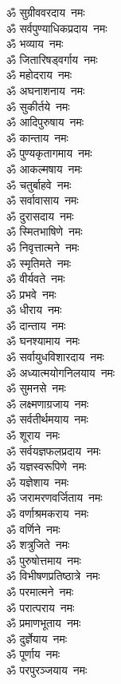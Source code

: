 \begin{multicols}{2}
\begin{flushleft}
ॐ सुग्रीववरदाय~नमः\\
ॐ सर्वपुण्याधिकप्रदाय~नमः\\
ॐ भव्याय~नमः\\
ॐ जितारिषड्वर्गाय~नमः\\
ॐ महोदराय~नमः\hfill{}\\
ॐ अघनाशनाय~नमः\\
ॐ सुकीर्तये~नमः\\
ॐ आदिपुरुषाय~नमः\\
ॐ कान्ताय~नमः\\
ॐ पुण्यकृतागमाय~नमः\\
ॐ आकल्मषाय~नमः\\
ॐ चतुर्बाहवे~नमः\\
ॐ सर्वावासाय~नमः\\
ॐ दुरासदाय~नमः\\
ॐ स्मितभाषिणे~नमः\hfill{}\\
ॐ निवृत्तात्मने~नमः\\
ॐ स्मृतिमते~नमः\\
ॐ वीर्यवते~नमः\\
ॐ प्रभवे~नमः\\
ॐ धीराय~नमः\\
ॐ दान्ताय~नमः\\
ॐ घनश्यामाय~नमः\\
ॐ सर्वायुधविशारदाय~नमः\\
ॐ अध्यात्मयोगनिलयाय~नमः\\
ॐ सुमनसे~नमः\hfill{}\\
ॐ लक्ष्मणाग्रजाय~नमः\\
ॐ सर्वतीर्थमयाय~नमः\\
ॐ शूराय~नमः\\
ॐ सर्वयज्ञफलप्रदाय~नमः\\
ॐ यज्ञस्वरूपिणे~नमः\\
ॐ यज्ञेशाय~नमः\\
ॐ जरामरणवर्जिताय~नमः\\
ॐ वर्णाश्रमकराय~नमः\\
ॐ वर्णिने~नमः\\
ॐ शत्रुजिते~नमः\hfill{}\\
ॐ पुरुषोत्तमाय~नमः\\
ॐ विभीषणप्रतिष्ठात्रे~नमः\\
ॐ परमात्मने~नमः\\
ॐ परात्पराय~नमः\\
ॐ प्रमाणभूताय~नमः\\
ॐ दुर्ज्ञेयाय~नमः\\
ॐ पूर्णाय~नमः\\
ॐ परपुरञ्जयाय~नमः\\

\end{flushleft}
\end{multicols}
